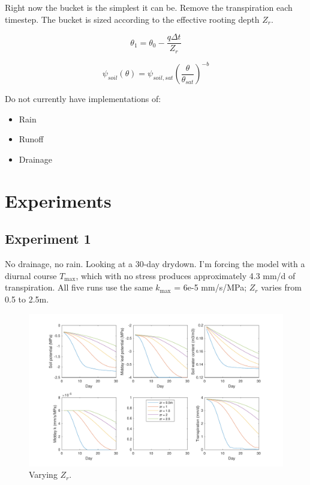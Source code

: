 \documentclass[11pt]{article}
\begin{document}
Right now the bucket is the simplest it can be. Remove the transpiration each timestep. The bucket is sized according to the effective rooting depth $Z_r$.

\begin{equation}
\theta_1 = \theta_0 - \dfrac{q\Delta t}{Z_r}
\end{equation}

\begin{equation}
\psi_{soil}\left(\theta\right) = \psi_{soil,sat}\left(\dfrac{\theta}{\theta_{sat}}\right)^{-b}
\end{equation}

Do not currently have implementations of:
\begin{itemize}
\item Rain
\item Runoff
\item Drainage
\end{itemize}


\clearpage
\section{Experiments}

\subsection{Experiment 1}
No drainage, no rain. Looking at a 30-day drydown. I'm forcing the model with a diurnal course $T_\text{max}$, which with no stress produces approximately 4.3 mm/d of transpiration. All five runs use the same $k_\text{max}$ = 6e-5 mm/s/MPa; $Z_r$ varies from 0.5 to 2.5m.

\begin{figure}[h]
\centering
\includegraphics[width=35pc]{../figs/exp1}
\caption{Varying $Z_r$.}
\label{fig:exp1}
\end{figure}
\end{document}
